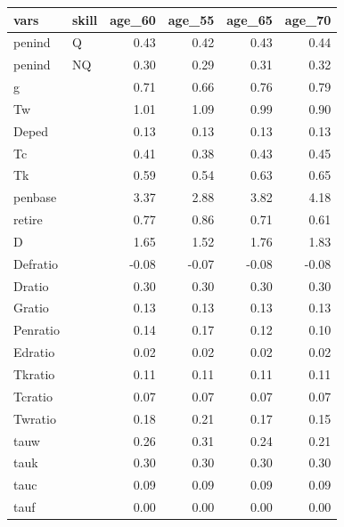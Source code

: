 \begin{tabular}{llrrrr}
  \hline
vars & skill & age\_60 & age\_55 & age\_65 & age\_70 \\ 
  \hline
penind & Q & 0.43 & 0.42 & 0.43 & 0.44 \\ 
  penind & NQ & 0.30 & 0.29 & 0.31 & 0.32 \\ 
  g &  & 0.71 & 0.66 & 0.76 & 0.79 \\ 
  Tw &  & 1.01 & 1.09 & 0.99 & 0.90 \\ 
  Deped &  & 0.13 & 0.13 & 0.13 & 0.13 \\ 
  Tc &  & 0.41 & 0.38 & 0.43 & 0.45 \\ 
  Tk &  & 0.59 & 0.54 & 0.63 & 0.65 \\ 
  penbase &  & 3.37 & 2.88 & 3.82 & 4.18 \\ 
  retire &  & 0.77 & 0.86 & 0.71 & 0.61 \\ 
  D &  & 1.65 & 1.52 & 1.76 & 1.83 \\ 
  Defratio &  & -0.08 & -0.07 & -0.08 & -0.08 \\ 
  Dratio &  & 0.30 & 0.30 & 0.30 & 0.30 \\ 
  Gratio &  & 0.13 & 0.13 & 0.13 & 0.13 \\ 
  Penratio &  & 0.14 & 0.17 & 0.12 & 0.10 \\ 
  Edratio &  & 0.02 & 0.02 & 0.02 & 0.02 \\ 
  Tkratio &  & 0.11 & 0.11 & 0.11 & 0.11 \\ 
  Tcratio &  & 0.07 & 0.07 & 0.07 & 0.07 \\ 
  Twratio &  & 0.18 & 0.21 & 0.17 & 0.15 \\ 
  tauw &  & 0.26 & 0.31 & 0.24 & 0.21 \\ 
  tauk &  & 0.30 & 0.30 & 0.30 & 0.30 \\ 
  tauc &  & 0.09 & 0.09 & 0.09 & 0.09 \\ 
  tauf &  & 0.00 & 0.00 & 0.00 & 0.00 \\ 
   \hline
\end{tabular}
